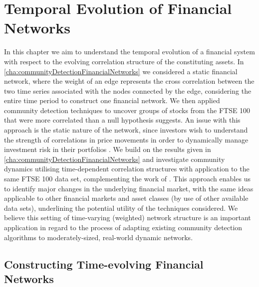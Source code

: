 
\chapter{Temporal Evolution of Financial Networks}

\label{cha:temporalEvolutionFinancialNetworks}


In this chapter we aim to understand the temporal evolution of a financial system with respect to the evolving correlation structure of the constituting assets.
In \cref{cha:communityDetectionFinancialNetworks} we considered a static financial network, where the weight of an edge represents the cross correlation between the two time series associated with the nodes connected by the edge, considering the entire time period to construct one financial network.
We then applied community detection techniques to uncover groups of stocks from the FTSE 100 that were more correlated than a null hypothesis suggests.
An issue with this approach is the static nature of the network, since investors wish to understand the strength of correlations in price movements in order to dynamically manage investment risk in their portfolios \cite{FPW+11}.
We build on the results given in \cref{cha:communityDetectionFinancialNetworks} and investigate community dynamics utilising time-dependent correlation structures with application to the same FTSE 100 data set, complementing the work of \cite{OCK+02,OKK03,BD10,FPM+10,FPW+11}.
This approach enables us to identify major changes in the underlying financial market, with the same ideas applicable to other financial markets and asset classes (by use of other available data sets), underlining the potential utility of the techniques considered.
We believe this setting of time-varying (weighted) network structure is an important application in regard to the process of adapting existing community detection algorithms to moderately-sized, real-world dynamic networks.


\section{Constructing Time-evolving Financial Networks}
\label{sec:timeEvolvingFinancialNetwork}


